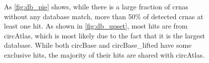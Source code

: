 \begin{figure}[ht]
\begin{tabular}{cc}
    \end{tabular}
    \caption{As \cref{fig:db_pie} shows, while there is a large fraction of
        \glspl{crna} without any
        database match, more than 50\% of detected \glspl{crna} at least one
        hit.
        As shown in \cref{fig:db_upset}, most hits are from circAtlas, which is most
        likely due to the fact that it is the largest database.
        While both circBase and circBase\_lifted have some exclusive hits, the majority
        of their hits are shared with circAtlas.
    }
    \label{fig:db_agreement}
\end{figure}
